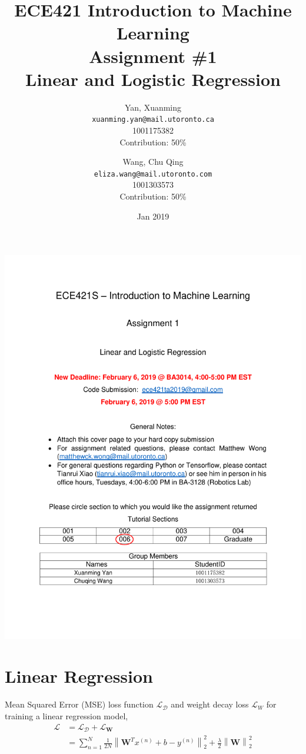 \documentclass[10pt,letterpaper]{article}
\title{ECE421 Introduction to Machine Learning \\
    Assignment \#1 \\
    Linear and Logistic Regression}
\date{Jan 2019}
\author{
  Yan, Xuanming\\
  \texttt{xuanming.yan@mail.utoronto.ca} \\
  1001175382 \\
  Contribution: 50\%
  \and
  Wang, Chu Qing\\
  \texttt{eliza.wang@mail.utoronto.com} \\
  1001303573\\
  Contribution: 50\%
} %
\begin{document}
\includegraphics[width=0.95\linewidth]{a1cover.pdf}
% 

\maketitle %


\section{Linear Regression}
\qquad Mean Squared Error (MSE) loss function $\mathcal{L}_{\mathcal{D}}$ and weight decay loss $\mathcal{L}_{W}$ for training a linear regression model, 
\begin{align*}
    \mathcal{L} &= \mathcal{L}_{\mathcal{D}} + \mathcal{L}_{\textbf{W}} \\
    &= \sum_{n=1}^{N}\frac{1}{2N}\left\| \textbf{W}^{T}x^{(n)} + b - y^{(n)} \right\|^{2}_{2} + \frac{\lambda}{2} \left\| \textbf{W} \right\|^{2}_{2}
\end{align*}
\end{document}
